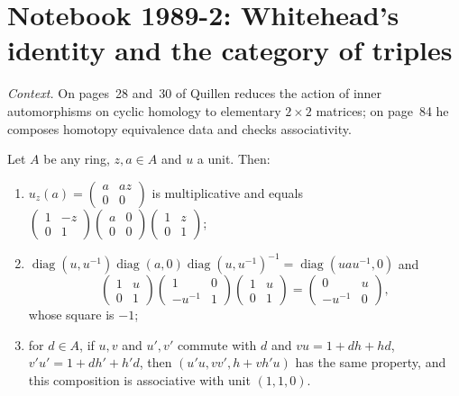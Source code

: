 \section[Notebook 1989-2: Whitehead matrices and triples]{Notebook 1989-2: Whitehead's identity and the category of triples\protect{}}\label{sec:quillen-1989-2-whitehead}

\emph{Context.} On pages~28 and~30 of  Quillen reduces the action of inner automorphisms on cyclic homology to elementary $2 \times 2$ matrices; on page~84 he composes homotopy equivalence data and checks associativity.

\begin{encadre}
\begin{theoreme}\label{thm:quillen-1989-2-whitehead}
Let $A$ be any ring, $z, a \in A$ and $u$ a unit. Then:
\begin{enumerate}
\item $u_z(a) = \begin{pmatrix}a & az\\ 0 & 0\end{pmatrix}$ is multiplicative and equals $\begin{pmatrix}1 & -z\\ 0 & 1\end{pmatrix}\begin{pmatrix}a & 0\\ 0 & 0\end{pmatrix}\begin{pmatrix}1 & z\\ 0 & 1\end{pmatrix}$;
\item $\operatorname{diag}(u, u^{-1})\operatorname{diag}(a, 0)\operatorname{diag}(u, u^{-1})^{-1} = \operatorname{diag}(uau^{-1}, 0)$ and
\[\begin{pmatrix}1 & u\\ 0 & 1\end{pmatrix}\begin{pmatrix}1 & 0\\ -u^{-1} & 1\end{pmatrix}\begin{pmatrix}1 & u\\ 0 & 1\end{pmatrix} = \begin{pmatrix}0 & u\\ -u^{-1} & 0\end{pmatrix},\]
whose square is $-1$;
\item for $d \in A$, if $u, v$ and $u', v'$ commute with $d$ and $vu = 1 + dh + hd$, $v'u' = 1 + dh' + h'd$, then $(u'u, vv', h + vh'u)$ has the same property, and this composition is associative with unit $(1, 1, 0)$.
\end{enumerate}
\end{theoreme}
\end{encadre}


